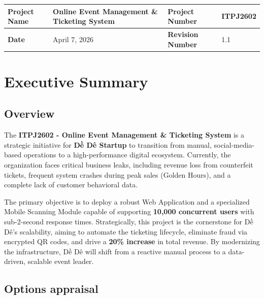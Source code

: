
\noindent
\begin{tabularx}{\textwidth}{|l|Y|l|Y|}
\hline
\textbf{Project Name} & Online Event Management \& Ticketing System & \textbf{Project Number} & ITPJ2602 \\ \hline
\textbf{Date} & April 7, 2026 & \textbf{Revision Number} & 1.1 \\ \hline
\end{tabularx}

\vspace{2cm}

\chapter{Executive Summary}
\section{Overview}

The \textbf{ITPJ2602 - Online Event Management \& Ticketing System} is a strategic initiative for \textbf{Dề Dê Startup} to transition from manual, social-media-based operations to a high-performance digital ecosystem. Currently, the organization faces critical business leaks, including revenue loss from counterfeit tickets, frequent system crashes during peak sales (Golden Hours), and a complete lack of customer behavioral data.

The primary objective is to deploy a robust Web Application and a specialized Mobile Scanning Module capable of supporting \textbf{10,000 concurrent users} with sub-2-second response times. Strategically, this project is the cornerstone for Dề Dê’s scalability, aiming to automate the ticketing lifecycle, eliminate fraud via encrypted QR codes, and drive a \textbf{20\% increase} in total revenue. By modernizing the infrastructure, Dề Dê will shift from a reactive manual process to a data-driven, scalable event leader.

\section{Options appraisal}

